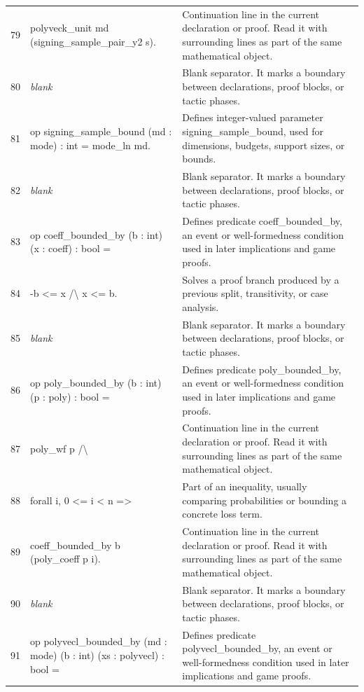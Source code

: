 \documentclass[10pt]{article}
\begin{document}
\begin{longtable}{r L{0.53\textwidth} L{0.37\textwidth}}
79 & {\ttfamily\scriptsize   polyveck\_unit md (signing\_sample\_pair\_y2 s).} & Continuation line in the current declaration or proof.  Read it with surrounding lines as part of the same mathematical object. \\
80 & {\ttfamily\scriptsize \emph{blank}} & Blank separator.  It marks a boundary between declarations, proof blocks, or tactic phases. \\
81 & {\ttfamily\scriptsize op signing\_sample\_bound (md : mode) : int = mode\_ln md.} & Defines integer-valued parameter signing\_sample\_bound, used for dimensions, budgets, support sizes, or bounds. \\
82 & {\ttfamily\scriptsize \emph{blank}} & Blank separator.  It marks a boundary between declarations, proof blocks, or tactic phases. \\
83 & {\ttfamily\scriptsize op coeff\_bounded\_by (b : int) (x : coeff) : bool =} & Defines predicate coeff\_bounded\_by, an event or well-formedness condition used in later implications and game proofs. \\
84 & {\ttfamily\scriptsize   -b <= x /\textbackslash{} x <= b.} & Solves a proof branch produced by a previous split, transitivity, or case analysis. \\
85 & {\ttfamily\scriptsize \emph{blank}} & Blank separator.  It marks a boundary between declarations, proof blocks, or tactic phases. \\
86 & {\ttfamily\scriptsize op poly\_bounded\_by (b : int) (p : poly) : bool =} & Defines predicate poly\_bounded\_by, an event or well-formedness condition used in later implications and game proofs. \\
87 & {\ttfamily\scriptsize   poly\_wf p /\textbackslash{}} & Continuation line in the current declaration or proof.  Read it with surrounding lines as part of the same mathematical object. \\
88 & {\ttfamily\scriptsize   forall i, 0 <= i < n =>} & Part of an inequality, usually comparing probabilities or bounding a concrete loss term. \\
89 & {\ttfamily\scriptsize     coeff\_bounded\_by b (poly\_coeff p i).} & Continuation line in the current declaration or proof.  Read it with surrounding lines as part of the same mathematical object. \\
90 & {\ttfamily\scriptsize \emph{blank}} & Blank separator.  It marks a boundary between declarations, proof blocks, or tactic phases. \\
91 & {\ttfamily\scriptsize op polyvecl\_bounded\_by (md : mode) (b : int) (xs : polyvecl) : bool =} & Defines predicate polyvecl\_bounded\_by, an event or well-formedness condition used in later implications and game proofs. \\

\end{longtable}
\end{document}
